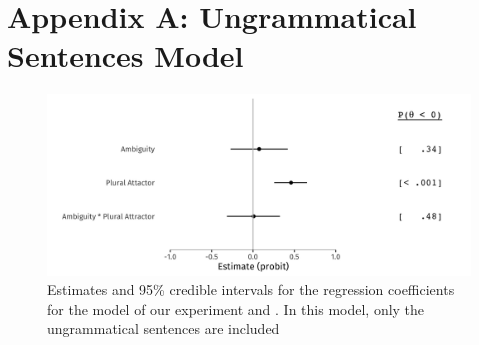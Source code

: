 \documentclass[brill,linguex]{glossa}\usepackage[]{graphicx}\usepackage[]{color}
\makeatletter
\def\maxwidth{ %
  \ifdim\Gin@nat@width>\linewidth
    \linewidth
  \else
    \Gin@nat@width
  \fi
}
\newenvironment{knitrout}{}{} %
\makeatother
\begin{document}
  















\section*{Appendix A: Ungrammatical Sentences Model}


\begin{figure}[hbt!]
\centering


\begin{knitrout}
\color{fgcolor}

{\centering \includegraphics[width=\maxwidth]{figure/UngramResponseModel-1} 

}


\end{knitrout}

\caption{Estimates and 95\% credible intervals for the regression coefficients for the model of our experiment and \citet{LagoEtAl:2019}. In this model, only the ungrammatical sentences are included}
\label{fig:UngramResponseModel}
\end{figure}
\end{document}
